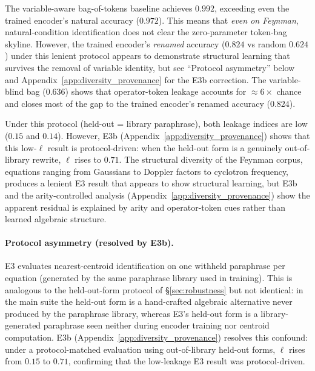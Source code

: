 The variable-aware bag-of-tokens baseline achieves $0.992$, exceeding even the trained encoder's natural accuracy ($0.972$). This means that \emph{even on Feynman}, natural-condition identification does not clear the zero-parameter token-bag skyline. However, the trained encoder's \emph{renamed} accuracy ($0.824$ vs random $0.624$) under this lenient protocol appears to demonstrate structural learning that survives the removal of variable identity, but see ``Protocol asymmetry'' below and Appendix~\ref{app:diversity_provenance} for the E3b correction. The variable-blind bag ($0.636$) shows that operator-token leakage accounts for ${\approx}6\times$ chance and closes most of the gap to the trained encoder's renamed accuracy ($0.824$).

Under this protocol (held-out = library paraphrase), both leakage indices are low ($0.15$ and $0.14$). However, E3b (Appendix~\ref{app:diversity_provenance}) shows that this low-$\ell$ result is protocol-driven: when the held-out form is a genuinely out-of-library rewrite, $\ell$ rises to $0.71$. The structural diversity of the Feynman corpus, equations ranging from Gaussians to Doppler factors to cyclotron frequency, produces a lenient E3 result that appears to show structural learning, but E3b and the arity-controlled analysis (Appendix~\ref{app:diversity_provenance}) show the apparent residual is explained by arity and operator-token cues rather than learned algebraic structure.

\paragraph{Protocol asymmetry (resolved by E3b).} E3 evaluates nearest-centroid identification on one withheld paraphrase per equation (generated by the same paraphrase library used in training). This is analogous to the held-out-form protocol of \S\ref{sec:robustness} but not identical: in the main suite the held-out form is a hand-crafted algebraic alternative never produced by the paraphrase library, whereas E3's held-out form is a library-generated paraphrase seen neither during encoder training nor centroid computation. E3b (Appendix~\ref{app:diversity_provenance}) resolves this confound: under a protocol-matched evaluation using out-of-library held-out forms, $\ell$ rises from $0.15$ to $0.71$, confirming that the low-leakage E3 result was protocol-driven.

